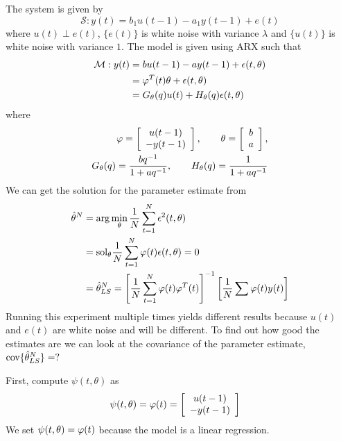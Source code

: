 \begin{example}
The system is given by
$$\mathcal{S}: y(t) = b_1u(t-1)-a_1y(t-1)+e(t)$$
where $u(t)\perp e(t)$, $\{e(t)\}$ is white noise with variance $\lambda$ and $\{u(t)\}$ is white noise with variance $1$. The model is given using ARX such that
\begin{align*}
\mathcal{M}: y(t) &= bu(t-1)-ay(t-1)+\epsilon(t,\theta) \\
&= \varphi^T(t)\theta+\epsilon(t,\theta) \\
&= G_\theta(q)u(t) + H_\theta(q)\epsilon(t,\theta)
\end{align*}
where
\begin{align*}
\varphi = \left[\begin{array}{c} u(t-1) \\ -y(t-1) \end{array}\right], \qquad \theta = \left[\begin{array}{c} b \\ a \end{array}\right], \\ G_\theta(q) = \frac{bq^{-1}}{1+aq^{-1}}, \qquad H_\theta(q) = \frac{1}{1+aq^{-1}}
\end{align*}
We can get the solution for the parameter estimate from
\begin{align*}
\hat{\theta}^N &= \arg\min_\theta\frac{1}{N}\sum_{t=1}^N\epsilon^2(t,\theta) \\
&= \text{sol}_\theta\frac{1}{N}\sum_{t=1}^N\varphi(t)\epsilon(t,\theta) = 0 \\
&= \hat{\theta}_{LS}^N = \left[\frac{1}{N}\sum_{t=1}^N\varphi(t)\varphi^T(t)\right]^{-1}\left[\frac{1}{N}\sum\varphi(t)y(t)\right]
\end{align*}
Running this experiment multiple times yields different results because $u(t)$ and $e(t)$ are white noise and will be different. To find out how good the estimates are we can look at the covariance of the parameter estimate, $\text{cov}\{\hat{\theta}_{LS}^N\}=?$

First, compute $\psi(t,\theta)$ as
\begin{align*}
\psi(t,\theta) &= \varphi(t) = \left[\begin{array}{c} u(t-1) \\ -y(t-1) \end{array}\right]
\end{align*}
We set $\psi(t,\theta)=\varphi(t)$ because the model is a linear regression.


\end{example}

